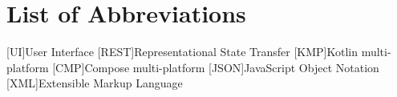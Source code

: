 \documentclass[english, sem, kiv, he, iso690alph, pdf, viewonly]{fasthesis}
\begin{document}
%
%
%
%

\appendix
%
%
%
%
\chapter{List of Abbreviations}\label{app:abbreviations}

\begin{acronym}
[UI]{User Interface}
[REST]{Representational State Transfer}
[KMP]{Kotlin multi-platform}
[CMP]{Compose multi-platform}
[JSON]{JavaScript Object Notation}
[XML]{Extensible Markup Language}
\end{acronym}


%
%
%
%
\backmatter
\listoffigures 
\listoftables
\listoflistings
%
%
\backpage
\end{document}
